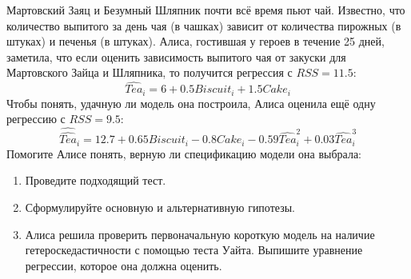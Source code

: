 \begin{problem}
Мартовский Заяц и Безумный Шляпник почти всё время пьют чай. Известно, что количество выпитого за день чая (в чашках) зависит от количества пирожных (в штуках) и печенья (в штуках).
Алиса, гостившая у героев в течение 25 дней, заметила, что если оценить зависимость выпитого чая от закуски для Мартовского Зайца и Шляпника, то получится регрессия с $RSS=11.5$:
\[
\widehat{Tea}_i=6+0.5Biscuit_i+1.5Cake_i
\]
Чтобы понять, удачную ли модель она построила,  Алиса оценила ещё одну регрессию с $RSS=9.5$:
\[
\widehat{\widehat{Tea}}_i=12.7+0.65Biscuit_i-0.8Cake_i-0.59\widehat{Tea}^2_i+0.03\widehat{Tea}^3_i
\]
Помогите Алисе понять, верную ли спецификацию модели она выбрала:
\begin{enumerate}
\item Проведите подходящий тест.
\item Сформулируйте основную и альтернативную гипотезы.
\item Алиса решила проверить первоначальную короткую модель на наличие гетероскедастичности с помощью теста Уайта. Выпишите уравнение регрессии, которое она должна оценить.
\end{enumerate}


\begin{sol}
\end{sol}
\end{problem}




